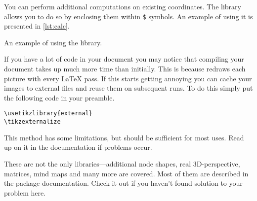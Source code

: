 You can perform additional computations on existing
coordinates. The  library allows you to do so by enclosing them
within \verb|$| symbols. An example of using it is presented in
\autoref{lst:calc}.

\begin{listing}
  \begin{example}[vertical_mode, examplewidth=0.8\linewidth]
\usetikzlibrary{calc}

\end{example}
  \caption{An example of using the  library.}\label{lst:calc}
\end{listing}

If you have a lot of \TikZ{} code in your document you may notice that
compiling your document takes up much more time than initially. This is because
\TikZ{} redraws each picture with every \LaTeX{} pass. If this starts getting
annoying you can cache your images to external files and reuse them on
subsequent runs. To do this simply put the following code in your preamble.
\begin{verbatim}
\usetikzlibrary{external}
\tikzexternalize
\end{verbatim}
This method has some limitations, but should be sufficient for most uses. Read
up on it in the documentation if problems occur.

These are not the only libraries---additional node shapes, real 3D-perspective,
matrices, mind maps and many more are covered. Most of them are described in
the  package documentation. Check it out if you haven't found
solution to your problem here.
